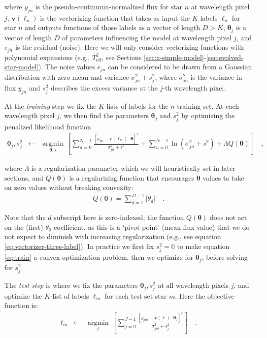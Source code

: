 \documentclass[preprint,trackchanges]{aastex}
\newcommand{\teff}{T_{\mathrm{eff}}}
\newcommand{\Dvector}[1]{\boldsymbol{#1}}
\newcommand{\vectheta}{\Dvector{\theta}}
\newcommand{\vecv}{\Dvector{v}}
\newcommand{\argmin}[1]{\underset{#1}{\operatorname{argmin}}\,}
\begin{document}
\noindent{}where $y_{jn}$ is the pseudo-continuum-normalized flux for star $n$ at wavelength pixel
$j$, $\vecv(\ell_n)$ is the vectorizing function that takes as input the $K$ labels
$\ell_n$ for star $n$ and outputs functions of those labels as a vector of length
$D>K$, $\vectheta_j$ is a vector of length $D$ of parameters influencing the model at
wavelength pixel $j$, and $e_{jn}$ is the residual (noise).  Here we will only consider
vectorizing functions with polynomial expansions (e.g., $\teff^2$, see Sections 
\ref{sec:a-simple-model}-\ref{sec:evolved-star-model}).  The noise values $e_{jn}$ can 
be considered to be drawn from a Gaussian distribution with zero mean and variance 
$\sigma_{jn}^2 + s_j^2$, where $\sigma_{jn}^2$ is the variance in flux $y_{jn}$ and 
$s_j^2$ describes the excess variance at the $j$-th wavelength pixel. 


At the \emph{training} step we fix the $K$-lists of labels for the $n$ training set.
At each wavelength pixel $j$, we then find the parameters $\vectheta_j$ and $s_j^2$
by optimizing the penalized likelihood function
\begin{eqnarray}\label{eq:train}
\vectheta_j,s^2_j &\leftarrow& \argmin{\vectheta,s}\left[
    \sum_{n=0}^{N-1} \frac{[y_{jn}-\vecv(\ell_n)\cdot\vectheta]^2}{\sigma^2_{jn}+s^2}
    + \sum_{n=0}^{N-1} \ln(\sigma^2_{jn}+s^2) + \Lambda{}Q(\vectheta)
    \right]
  \quad ,
\end{eqnarray}

\noindent{}where $\Lambda$ is a regularization parameter which we will heuristically set
in later sections, and $Q(\vectheta)$ is a regularizing function that encourages 
$\vectheta$ values to take on zero values without breaking convexity:
\begin{eqnarray}\label{eq:regularization-function}
	Q(\vectheta) = \sum_{d=1}^{D-1} |{\theta_d}| \quad .
\end{eqnarray}

Note that the $d$ subscript here is zero-indexed; the function $Q(\vectheta)$ does not act
on the (first) $\theta_0$ coefficient, as this is a `pivot point' (mean flux value) that 
we do not expect to diminish with increasing regularization (e.g., see equation 
\ref{eq:vectorizer-three-label}).  In practice we first fix $s_j^2 = 0$ to make equation
\ref{eq:train} a convex optimization problem, then we optimize for $\vectheta_j$, before 
solving for $s_j^2$.  


The \emph{test step} is where we fix the parameters $\vectheta_j,s_j^2$ at all wavelength
pixels $j$, and optimize the $K$-list of labels $\ell_m$ for each test set star $m$.  Here
the objective function is:
\begin{eqnarray}\label{eq:test}
  \ell_m &\leftarrow& \argmin{\ell}\left[
    \sum_{j=0}^{J-1} \frac{[y_{jm}-\vecv(\ell)\cdot\vectheta_j]^2}{\sigma_{jm}^2 + s_j^2}
    \right]
  \quad .
\end{eqnarray}
\end{document}

